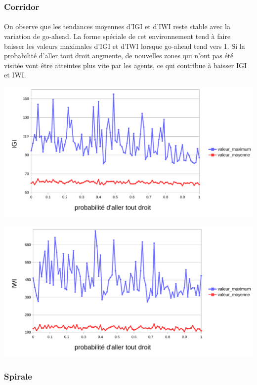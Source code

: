 \documentclass{article}
\begin{document}
    \subsubsection{Corridor}
    \paragraph{}On observe que les tendances moyennes d'IGI et d'IWI reste stable avec la variation de go-ahead. La forme spéciale de cet environnement tend à faire baisser les valeurs maximales d'IGI et d'IWI lorsque go-ahead tend  vers 1.
    Si la probabilité d'aller tout droit augmente, de nouvelles zones qui n'ont pas été visitée vont être atteintes plus vite par les agents, ce qui contribue à baisser IGI et IWI.
    \begin{center}
        \includegraphics[width = \textwidth]{graphes pdf/variance go-ahead IGI corridor.pdf}
    \end{center}
    \begin{center}
        \includegraphics[width = \textwidth]{graphes pdf/variance go-ahead IWI corridor.pdf}
    \end{center}
    \subsubsection{Spirale}
\end{document}
